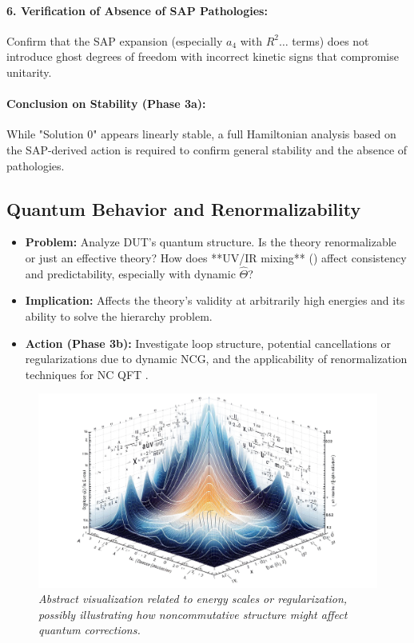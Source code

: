\documentclass[11pt, a4paper]{article}
\theoremstyle{remark}
\newcommand{\Op}[1]{\hat{#1}}
\begin{document}
\paragraph{6. Verification of Absence of SAP Pathologies:} Confirm that the SAP expansion (especially \( a_4 \) with \( R^2 \dots \) terms) does not introduce ghost degrees of freedom with incorrect kinetic signs that compromise unitarity.

\paragraph{Conclusion on Stability (Phase 3a):} While "Solution 0" appears linearly stable, a full Hamiltonian analysis based on the SAP-derived action is required to confirm general stability and the absence of pathologies.

\subsection{Quantum Behavior and Renormalizability}
\label{subsec:quantum_behavior_detailed}
\begin{itemize}
    \item \textbf{Problem:} Analyze DUT's quantum structure. Is the theory renormalizable or just an effective theory? How does **UV/IR mixing** () affect consistency and predictability, especially with dynamic \( \Op{\Theta} \)?
    \item \textbf{Implication:} Affects the theory's validity at arbitrarily high energies and its ability to solve the hierarchy problem.
    \item \textbf{Action (Phase 3b):} Investigate loop structure, potential cancellations or regularizations due to dynamic NCG, and the applicability of renormalization techniques for NC QFT \citep{GrosseWulkenhaar2005, Rivasseau:2010}.
\end{itemize}

\begin{figure}[htbp]
    \centering
    \includegraphics[width=0.6\linewidth]{OIG36.ZNLJ.PNG}
    \caption{%
     \footnotesize\textit{Abstract visualization related to energy scales or regularization, possibly illustrating how noncommutative structure might affect quantum corrections.}
    }
    \label{fig:Figura18}
\end{figure}
\end{document}
